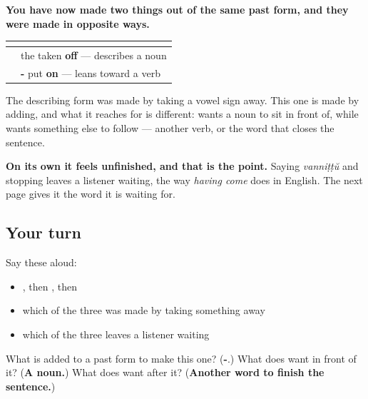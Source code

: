 \begin{grammarlens}[title={Grammar Lens: one past form, two directions}]
\textbf{You have now made two things out of the same past form, and they were made in opposite ways.}

\noindent
\begin{tabularx}{\linewidth}{@{}>{\raggedright\arraybackslash}X>{\raggedright\arraybackslash}X@{}}
\toprule
\textbf{} & \textbf{} \\
\midrule
\textbf{\ml{വന്ന}} & the \textbf{\ml{ു}} taken \textbf{off} — describes a noun \\
\textbf{\ml{വന്നിട്ട്}} & \textbf{-\ml{ഇട്ട്}} put \textbf{on} — leans toward a verb \\
\bottomrule
\end{tabularx}

The describing form was made by taking a vowel sign away. This one is made by adding, and what it reaches for is different: \textbf{} wants a noun to sit in front of, while \textbf{} wants something else to follow — another verb, or the word that closes the sentence.

\textbf{On its own it feels unfinished, and that is the point.} Saying \emph{vanniṭṭŭ} and stopping leaves a listener waiting, the way \emph{having come} does in English. The next page gives it the word it is waiting for.
\end{grammarlens}

\subsection*{Your turn}
Say these aloud:

\begin{itemize}
\raggedright
  \item \textbf{}, then \textbf{}, then \textbf{}
  \item which of the three was made by taking something away
  \item which of the three leaves a listener waiting
\end{itemize}

\begin{tcolorbox}[breakable,colback=teal!4,colframe=teal!35!black,title={Before you move on}]
What is added to a past form to make this one? (\textbf{-}.) What does \textbf{} want in front of it? (\textbf{A noun.}) What does \textbf{} want after it? (\textbf{Another word to finish the sentence.})
\end{tcolorbox}
